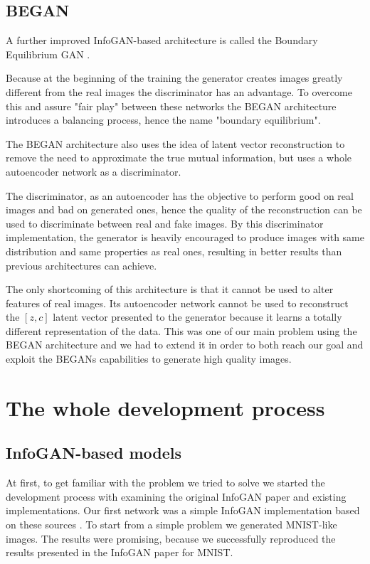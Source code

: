 \documentclass{egpubl}
\begin{document}
\subsection{BEGAN}
\label{sec:digErr}

A further improved InfoGAN-based architecture is called the Boundary Equilibrium GAN \cite{berthelot2017began}.

Because at the beginning of the training the generator creates images greatly different from the real images the discriminator has an advantage. To overcome this and assure "fair play" between these networks the BEGAN architecture introduces a balancing process, hence the name "boundary equilibrium".

The BEGAN architecture also uses the idea of latent vector reconstruction to remove the need to approximate the true mutual information, but uses a whole autoencoder network as a discriminator.

The discriminator, as an autoencoder has the objective to perform good on real images and bad on generated ones, hence the quality of the reconstruction can be used to discriminate between real and fake images. By this discriminator implementation, the generator is heavily encouraged to produce images with same distribution and same properties as real ones, resulting in better results than previous architectures can achieve.

The only shortcoming of this architecture is that it cannot be used to alter features of real images. Its autoencoder network cannot be used to reconstruct the $[z,c]$ latent vector presented to the generator because it learns a totally different representation of the data. This was one of our main problem using the BEGAN architecture and we had to extend it in order to both reach our goal and exploit the BEGANs capabilities to generate high quality images.


\section{The whole development process}

\subsection{InfoGAN-based models}

At first, to get familiar with the problem we tried to solve we started the development process with examining the original InfoGAN paper and existing implementations. Our first network was a simple InfoGAN implementation based on these sources \cite{chen2016infogan}. To start from a simple problem we generated MNIST-like images. The results were promising, because we successfully reproduced the results presented in the InfoGAN paper for MNIST.
\end{document}
